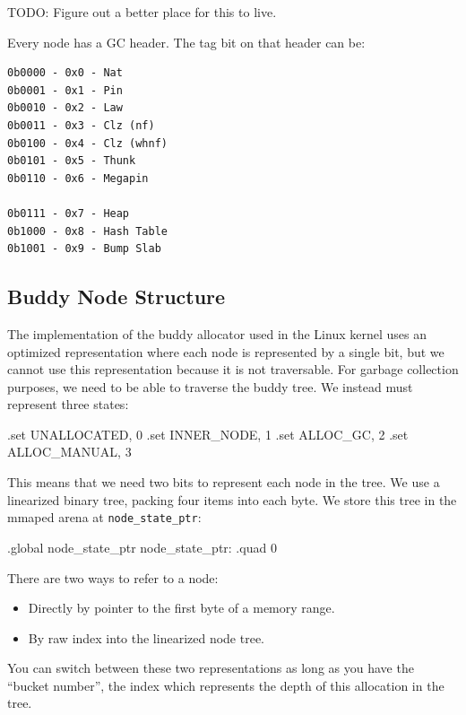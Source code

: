 TODO: Figure out a better place for this to live.

Every node has a GC header. The tag bit on that header can be:


\begin{verbatim}
0b0000 - 0x0 - Nat
0b0001 - 0x1 - Pin
0b0010 - 0x2 - Law
0b0011 - 0x3 - Clz (nf)
0b0100 - 0x4 - Clz (whnf)
0b0101 - 0x5 - Thunk
0b0110 - 0x6 - Megapin

0b0111 - 0x7 - Heap
0b1000 - 0x8 - Hash Table
0b1001 - 0x9 - Bump Slab
\end{verbatim}





\subsection{Buddy Node Structure}

The implementation of the buddy allocator used in the Linux kernel uses an
optimized representation where each node is represented by a single bit, but we
cannot use this representation because it is not traversable. For garbage
collection purposes, we need to be able to traverse the buddy tree. We instead
must represent three states:

\begin{asm}
.set	UNALLOCATED,	0
.set	INNER_NODE,	1
.set	ALLOC_GC,	2
.set	ALLOC_MANUAL,	3
\end{asm}

This means that we need two bits to represent each node in the tree. We use a
linearized binary tree, packing four items into each byte. We store this tree
in the mmaped arena at \lstinline|node_state_ptr|:

\begin{asmdata}
.global node_state_ptr
node_state_ptr: .quad 0
\end{asmdata}

There are two ways to refer to a node:

\begin{itemize}
\item
    Directly by pointer to the first byte of a memory range.
\item
    By raw index into the linearized node tree.
\end{itemize}

You can switch between these two representations as long as you have the
``bucket number'', the index which represents the depth of this allocation in
the tree.

